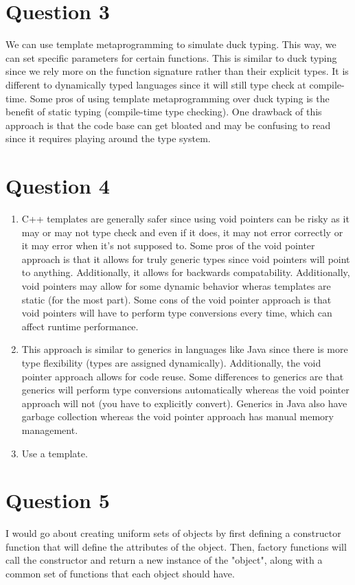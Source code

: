 \documentclass[13pt]{article}
\begin{document}
\newpage
\section*{Question 3}
We can use template metaprogramming to simulate duck typing. This way,
we can set specific parameters for certain functions. This is similar
to duck typing since we rely more on the function signature rather
than their explicit types. It is different to dynamically typed
languages since it will still type check at compile-time. Some pros of
using template metaprogramming over duck typing is the benefit of
static typing (compile-time type checking). One drawback of this
approach is that the code base can get bloated and may be confusing to
read since it requires playing around the type system.

\newpage
\section*{Question 4}
\begin{enumerate}[label=(\alph*)]
\item C++ templates are generally safer since using void pointers can
  be risky as it may or may not type check and even if it does, it may
  not error correctly or it may error when it's not supposed to. Some
  pros of the void pointer approach is that it allows for truly
  generic types since void pointers will point to
  anything. Additionally, it allows for backwards
  compatability. Additionally, void pointers may allow for some
  dynamic behavior wheras templates are static (for the most
  part). Some cons of the void pointer approach is that void pointers
  will have to perform type conversions every time, which can affect
  runtime performance. 

\item This approach is similar to generics in languages like Java
  since there is more type flexibility (types are assigned
  dynamically). Additionally, the void pointer approach allows for
  code reuse. Some differences to generics are that generics will
  perform type conversions automatically whereas the void pointer
  approach will not (you have to explicitly convert). Generics in Java
  also have garbage collection whereas the void pointer approach has
  manual memory management.

\item Use a template.
\end{enumerate}

\newpage
\section*{Question 5}
I would go about creating uniform sets of objects by first defining
a constructor function that will define the attributes of the
object. Then, factory functions will call the constructor and 
return a new instance of the "object", along with a common set of
functions that each object should have.
\end{document}
